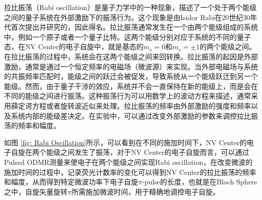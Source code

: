 \documentclass[type = bachelor, oneside]{whu-thesis}
\begin{document}
拉比振荡（Rabi oscillation）是量子力学中的一种现象，描述了一个处于两个能级之间的量子系统在外部激励下的振荡行为。这个现象是由Isidor Rabi在20世纪30年代首次提出并研究的，因此得名。拉比振荡通常发生在一个由两个能级组成的系统中，例如一个原子或者一个量子比特。这两个能级分别对应于系统的不同的量子态，在NV Center的电子自旋中，就是基态的$m_s=0$和$m_s = \pm1$的两个能级之间。在拉比振荡的过程中，系统会在这两个能级之间来回转换。拉比振荡的起因是外部激励，通常是通过一个恒定频率的电磁场（微波源）来实现。当外部电磁场与系统的共振频率匹配时，能级之间的跃迁会被促发，导致系统从一个能级跃迁到另一个能级。然而，由于量子干涉的效应，系统并不会一直保持在新的能级上，而是会在不同的能级之间进行振荡。这种振荡行为可以用数学上的波动方程来描述，通常采用薛定谔方程或者旋转波近似来处理。拉比振荡的频率由外部激励的强度和频率以及系统内部的能级差决定。在实验中，可以通过改变外部激励的参数来调控拉比振荡的频率和幅度。

如图 \ref{fig: Rabi Oscillation}所示，可以看到在不同的施加时间下，NV Center的电子自旋在两个能级之间发生了振荡，对于NV Center的电子自旋而言，可以通过Pulsed ODMR测量来使电子在两个能级之间实现Rabi oscillation，在改变微波的施加时间的过程中，记录荧光计数率的变化可以得到NV Center的拉比振荡的频率和幅度，从而得到特定微波功率下电子自旋$\pi$-pulse的长度，也就是在Bloch Sphere之中，自旋矢量旋转$\pi$所需施加微波时间，用于精确地调控电子自旋。
\end{document}
